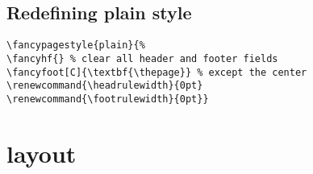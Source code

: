 \documentclass[a4paper,12pt]{article}
\begin{document}
\subsection{Redefining plain style}
\begin{verbatim}
\fancypagestyle{plain}{%
\fancyhf{} % clear all header and footer fields
\fancyfoot[C]{\textbf{\thepage}} % except the center
\renewcommand{\headrulewidth}{0pt}
\renewcommand{\footrulewidth}{0pt}}
\end{verbatim}
\newpage
\section{layout}
\layout
\end{document}

